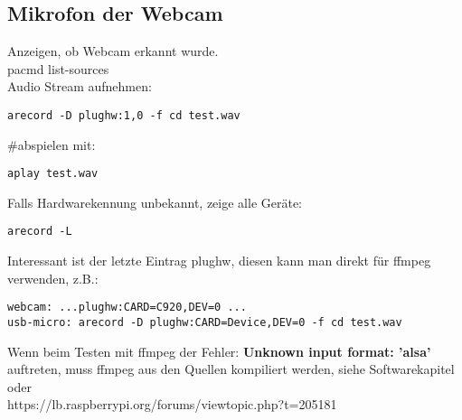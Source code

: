 \subsection{Mikrofon der Webcam}
Anzeigen, ob Webcam erkannt wurde.\\
pacmd list-sources\\ 

Audio Stream aufnehmen:
\begin{verbatim}arecord -D plughw:1,0 -f cd test.wav\end{verbatim}
\#abspielen mit:
\begin{verbatim}aplay test.wav\end{verbatim}

Falls Hardwarekennung unbekannt, zeige alle Geräte:
\begin{verbatim}arecord -L\end{verbatim}
Interessant ist der letzte Eintrag plughw, diesen kann man direkt für
ffmpeg verwenden, z.B.:
\begin{verbatim}
webcam: ...plughw:CARD=C920,DEV=0 ...
usb-micro: arecord -D plughw:CARD=Device,DEV=0 -f cd test.wav
\end{verbatim}

Wenn beim Testen mit ffmpeg der Fehler: 
\textbf{Unknown input format: 'alsa'}\\ 
auftreten, muss ffmpeg aus den Quellen kompiliert werden, siehe 
Softwarekapitel oder\\ 
https://lb.raspberrypi.org/forums/viewtopic.php?t=205181


 